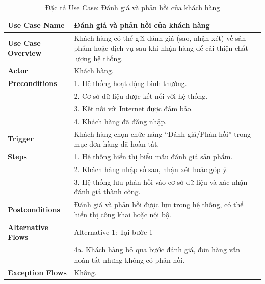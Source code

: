 {\begin{longtable}{|>{\bfseries}p{4cm}|p{11.5cm}|}
\caption{Đặc tả Use Case: Đánh giá và phản hồi của khách hàng}
\label{tab:uc-customer-review} \\
\hline
\textbf{Use Case Name} & Đánh giá và phản hồi của khách hàng \\
\hline
\textbf{Use Case Overview} & Khách hàng có thể gửi đánh giá (sao, nhận xét) về sản phẩm hoặc dịch vụ sau khi nhận hàng để cải thiện chất lượng hệ thống. \\
\hline
\textbf{Actor} & Khách hàng. \\
\hline
\textbf{Preconditions} & 1. Hệ thống hoạt động bình thường. \\
& 2. Cơ sở dữ liệu được kết nối với hệ thống. \\
& 3. Kết nối với Internet được đảm bảo. \\
& 4. Khách hàng đã đăng nhập. \\
\hline
\textbf{Trigger} & Khách hàng chọn chức năng “Đánh giá/Phản hồi” trong mục đơn hàng đã hoàn tất. \\
\hline
\textbf{Steps} & 1. Hệ thống hiển thị biểu mẫu đánh giá sản phẩm. \\
& 2. Khách hàng nhập số sao, nhận xét hoặc góp ý. \\
& 3. Hệ thống lưu phản hồi vào cơ sở dữ liệu và xác nhận đánh giá thành công. \\
\hline
\textbf{Postconditions} & Đánh giá và phản hồi được lưu trong hệ thống, có thể hiển thị công khai hoặc nội bộ. \\
\hline
\textbf{Alternative Flows} & Alternative 1: Tại bước 1 \\
& 4a. Khách hàng bỏ qua bước đánh giá, đơn hàng vẫn hoàn tất nhưng không có phản hồi. \\
\hline
\textbf{Exception Flows} & Không. \\
\hline
\end{longtable}

}
